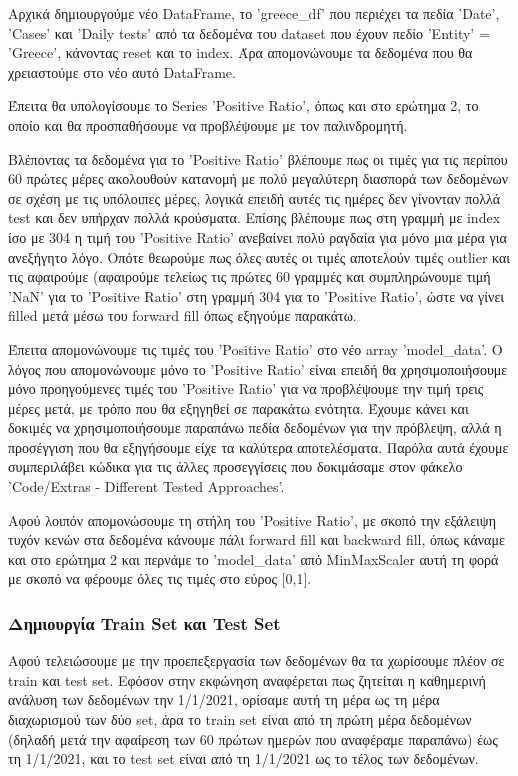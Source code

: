 \documentclass[12pt,a4paper]{article}
\begin{document}
Αρχικά δημιουργούμε νέο DataFrame, το 'greece\_df' που περιέχει τα πεδία 'Date', 'Cases' και 'Daily tests' από τα δεδομένα του dataset που έχουν πεδίο 'Entity' = 'Greece', κάνοντας reset και το index. Άρα απομονώνουμε τα δεδομένα που θα χρειαστούμε στο νέο αυτό DataFrame.

Έπειτα θα υπολογίσουμε το Series 'Positive Ratio', όπως και στο ερώτημα 2, το οποίο και θα προσπαθήσουμε να προβλέψουμε με τον παλινδρομητή.

Βλέποντας τα δεδομένα για το 'Positive Ratio' βλέπουμε πως οι τιμές για τις περίπου 60 πρώτες μέρες ακολουθούν κατανομή με πολύ μεγαλύτερη διασπορά των δεδομένων σε σχέση με τις υπόλοιπες μέρες, λογικά επειδή αυτές τις ημέρες δεν γίνονταν πολλά test και δεν υπήρχαν πολλά κρούσματα. Επίσης βλέπουμε πως στη γραμμή με index ίσο με 304 η τιμή του 'Positive Ratio' ανεβαίνει πολύ ραγδαία για μόνο μια μέρα για ανεξήγητο λόγο. Οπότε θεωρούμε πως όλες αυτές οι τιμές αποτελούν τιμές outlier και τις αφαιρούμε (αφαιρούμε τελείως τις πρώτες 60 γραμμές και συμπληρώνουμε τιμή 'NaN' για το 'Positive Ratio' στη γραμμή 304 για το 'Positive Ratio', ώστε να γίνει filled μετά μέσω του forward fill όπως εξηγούμε παρακάτω.

Έπειτα απομονώνουμε τις τιμές του 'Positive Ratio' στο νέο array 'model\_data'. Ο λόγος που απομονώνουμε μόνο το 'Positive Ratio' είναι επειδή θα χρησιμοποιήσουμε μόνο προηγούμενες τιμές του 'Positive Ratio' για να προβλέψουμε την τιμή τρεις μέρες μετά, με τρόπο που θα εξηγηθεί σε παρακάτω ενότητα. Έχουμε κάνει και δοκιμές να χρησιμοποιήσουμε παραπάνω πεδία δεδομένων για την πρόβλεψη, αλλά η προσέγγιση που θα εξηγήσουμε είχε τα καλύτερα αποτελέσματα. Παρόλα αυτά έχουμε συμπεριλάβει κώδικα για τις άλλες προσεγγίσεις που δοκιμάσαμε στον φάκελο 'Code/Extras - Different Tested Approaches'.

Αφού λοιπόν απομονώσουμε τη στήλη του 'Positive Ratio', με σκοπό την εξάλειψη τυχόν κενών στα δεδομένα κάνουμε πάλι forward fill και backward fill, όπως κάναμε και στο ερώτημα 2 και περνάμε το 'model\_data' από MinMaxScaler αυτή τη φορά με σκοπό να φέρουμε όλες τις τιμές στο εύρος [0,1].

\subsubsection{Δημιουργία Train Set και Test Set}

Αφού τελειώσουμε με την προεπεξεργασία των δεδομένων θα τα χωρίσουμε πλέον σε train και test set. Εφόσον στην εκφώνηση αναφέρεται πως ζητείται η καθημερινή ανάλυση των δεδομένων την 1/1/2021, ορίσαμε αυτή τη μέρα ως τη μέρα διαχωρισμού των δύο set, άρα το train set είναι από τη πρώτη μέρα δεδομένων (δηλαδή μετά την αφαίρεση των 60 πρώτων ημερών που αναφέραμε παραπάνω) έως τη 1/1/2021, και το test set είναι από τη 1/1/2021 ως το τέλος των δεδομένων.
\end{document}
